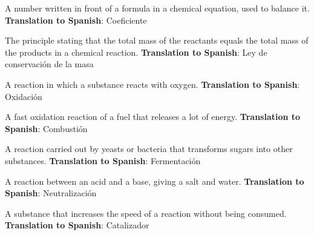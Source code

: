 \begin{vocabulary}[Coefficient]
    A number written in front of a formula in a chemical equation, used to balance it. \newline
    \textbf{Translation to Spanish}: Coeficiente
\end{vocabulary}

\begin{vocabulary}
    The principle stating that the total mass of the reactants equals the total mass of the products in a chemical reaction. \newline
    \textbf{Translation to Spanish}: Ley de conservación de la masa
\end{vocabulary}

\begin{vocabulary}[Oxidation]
    A reaction in which a substance reacts with oxygen. \newline
    \textbf{Translation to Spanish}: Oxidación
\end{vocabulary}

\begin{vocabulary}[Combustion]
    A fast oxidation reaction of a fuel that releases a lot of energy. \newline
    \textbf{Translation to Spanish}: Combustión
\end{vocabulary}

\begin{vocabulary}[Fermentation]
    A reaction carried out by yeasts or bacteria that transforms sugars into other substances. \newline
    \textbf{Translation to Spanish}: Fermentación
\end{vocabulary}

\begin{vocabulary}[Neutralisation]
    A reaction between an acid and a base, giving a salt and water. \newline
    \textbf{Translation to Spanish}: Neutralización
\end{vocabulary}

\begin{vocabulary}[Catalyst]
    A substance that increases the speed of a reaction without being consumed. \newline
    \textbf{Translation to Spanish}: Catalizador
\end{vocabulary}
